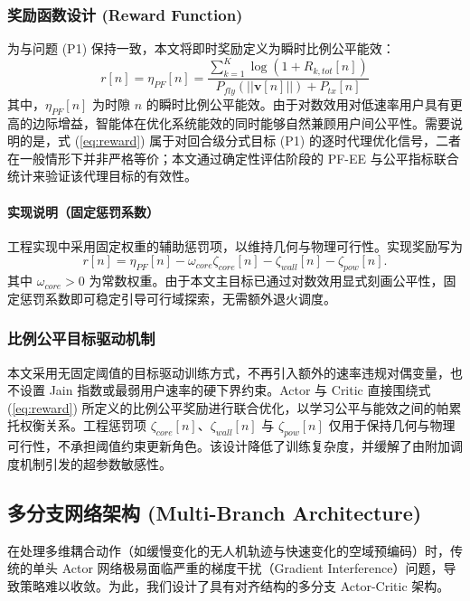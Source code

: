 \documentclass[journal,onecolumn]{IEEEtran}
\begin{document}
	\subsubsection{奖励函数设计 (Reward Function)}
	为与问题 (P1) 保持一致，本文将即时奖励定义为瞬时比例公平能效：
	\begin{equation}
		r[n] = \eta_{PF}[n] = \frac{\sum_{k=1}^K \log\left(1 + R_{k,tot}[n]\right)}{P_{fly}(||\mathbf{v}[n]||) + P_{tx}[n]}
		\label{eq:reward}
	\end{equation}
	其中，$\eta_{PF}[n]$ 为时隙 $n$ 的瞬时比例公平能效。由于对数效用对低速率用户具有更高的边际增益，智能体在优化系统能效的同时能够自然兼顾用户间公平性。需要说明的是，式 (\ref{eq:reward}) 属于对回合级分式目标 (P1) 的逐时代理优化信号，二者在一般情形下并非严格等价；本文通过确定性评估阶段的 PF-EE 与公平指标联合统计来验证该代理目标的有效性。
	
	\paragraph{实现说明（固定惩罚系数）}
	工程实现中采用固定权重的辅助惩罚项，以维持几何与物理可行性。实现奖励写为
	\begin{equation}
		r[n]=\eta_{PF}[n]-\omega_{core}\zeta_{core}[n]-\zeta_{wall}[n]-\zeta_{pow}[n].
		\label{eq:reward_impl_20260415}
	\end{equation}
	其中 $\omega_{core}>0$ 为常数权重。由于本文主目标已通过对数效用显式刻画公平性，固定惩罚系数即可稳定引导可行域探索，无需额外退火调度。
	
	
	
	\subsubsection{比例公平目标驱动机制}
	本文采用无固定阈值的目标驱动训练方式，不再引入额外的速率违规对偶变量，也不设置 Jain 指数或最弱用户速率的硬下界约束。Actor 与 Critic 直接围绕式 (\ref{eq:reward}) 所定义的比例公平奖励进行联合优化，以学习公平与能效之间的帕累托权衡关系。工程惩罚项 $\zeta_{core}[n]$、$\zeta_{wall}[n]$ 与 $\zeta_{pow}[n]$ 仅用于保持几何与物理可行性，不承担阈值约束更新角色。该设计降低了训练复杂度，并缓解了由附加调度机制引发的超参数敏感性。
	
	
	
	
	
	\subsection{多分支网络架构 (Multi-Branch Architecture)}
	在处理多维耦合动作（如缓慢变化的无人机轨迹与快速变化的空域预编码）时，传统的单头 Actor 网络极易面临严重的梯度干扰（Gradient Interference）问题，导致策略难以收敛。为此，我们设计了具有对齐结构的多分支 Actor-Critic 架构。
	
\end{document}
